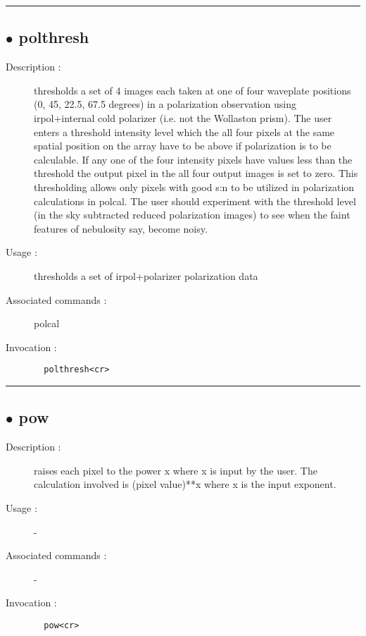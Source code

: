 \hrule \subsection*{$\bullet$ polthresh}
\begin{description}
\item[Description :] thresholds a set of 4 images each taken at one of four
waveplate positions (0, 45, 22.5, 67.5 degrees) in a polarization
observation using irpol+internal cold polarizer (i.e. not the Wollaston
prism).  The user enters a threshold intensity level which the all four
pixels at the same spatial position on the array have to be above if
polarization is to be calculable.  If any one of the four intensity
pixels have values less than the threshold the output pixel in the all
four output images is set to zero.  This thresholding allows only pixels
with good s:n to be utilized in polarization calculations in polcal. The
user should experiment with the threshold level (in the sky subtracted
reduced polarization images) to see when the faint features of nebulosity
say, become noisy.
\item[Usage :] thresholds a set of irpol+polarizer polarization data
\item[Associated commands :] polcal
\item[Invocation :]

\verb+  polthresh<cr> +\end{description}

\hrule \subsection*{$\bullet$ pow}
\begin{description}
\item[Description :] raises each pixel to the power x where x is input by the user. The
calculation involved is (pixel value)**x where x is the input exponent.
\item[Usage :] -
\item[Associated commands :] -
\item[Invocation :]

\verb+  pow<cr> +\end{description}

